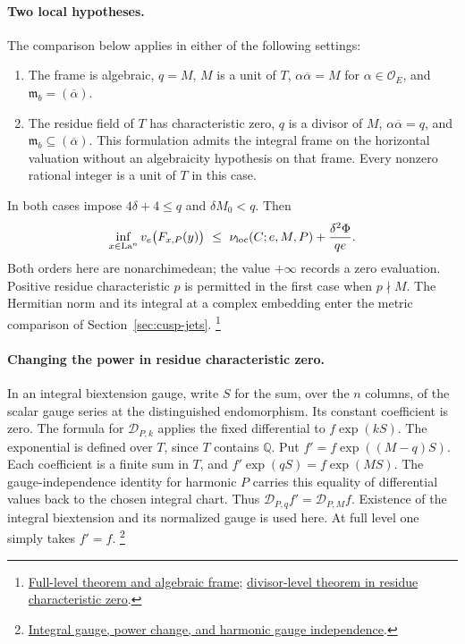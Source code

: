 \paragraph{Two local hypotheses.}
The comparison below applies in either of the following settings:
\begin{enumerate}
\item The frame is algebraic, \(q=M\), \(M\) is a unit of \(T\),
\(\alpha\overline\alpha=M\) for \(\alpha\in\mathcal O_E\), and
\(\mathfrak m_b=(\overline\alpha)\).
\item The residue field of \(T\) has characteristic zero,
\(q\) is a divisor of \(M\), \(\alpha\overline\alpha=q\), and
\(\mathfrak m_b\subseteq(\overline\alpha)\). This formulation admits
the integral frame on the horizontal valuation without an algebraicity
hypothesis on that frame. Every nonzero rational integer is a unit of
\(T\) in this case.
\end{enumerate}
In both cases impose \(4\delta+4\le q\) and \(\delta M_0<q\). Then
\begin{equation}\label{eq:local-theta-comp}
 \inf_{x\in\mathrm{La}^n}v_e\bigl(F_{x,P}(y)\bigr)
 \ \le\ \nu_{\rm loc}(C;e,M,P)+\frac{\delta^2\Phi}{qe}.
\end{equation}
Both orders here are nonarchimedean; the value \(+\infty\) records a
zero evaluation. Positive residue characteristic \(p\) is permitted in
the first case when \(p\nmid M\). The Hermitian norm and its integral at
a complex embedding enter the metric comparison of
Section~\ref{sec:cusp-jets}.
\footnote{\href{https://github.com/ChristianKudeba/alpoge-rh-verification/blob/alpoge-source-7cbf7a0c/src/Development/AbelianVarietyTheory/Proofs/DivisorProofs/IInfThRuleLeNuLocOf.lean}{Full-level theorem and algebraic frame};
\href{https://github.com/ChristianKudeba/alpoge-rh-verification/blob/alpoge-source-7cbf7a0c/src/Development/AbelianVarietyTheory/Proofs/DivisorProofs/IInfThetaRuleLeLocalValueCharZero.lean}{divisor-level theorem in residue characteristic zero}.}

\paragraph{Changing the power in residue characteristic zero.}
In an integral biextension gauge, write \(S\) for the sum, over the
\(n\) columns, of the scalar gauge series at the distinguished
endomorphism. Its constant coefficient is zero. The formula for
\(\mathcal D_{P,k}\) applies the fixed differential to
\(f\exp(kS)\). The exponential is defined over \(T\), since \(T\)
contains \(\mathbb Q\). Put \(f'=f\exp((M-q)S)\). Each coefficient
is a finite sum in \(T\), and \(f'\exp(qS)=f\exp(MS)\).
The gauge-independence identity for harmonic \(P\) carries this equality
of differential values back to the chosen integral chart. Thus
\(\mathcal D_{P,q}f'=\mathcal D_{P,M}f\). Existence of the integral
biextension and its normalized gauge is used here. At full level
one simply takes \(f'=f\).
\footnote{\href{https://github.com/ChristianKudeba/alpoge-rh-verification/blob/alpoge-source-7cbf7a0c/src/Development/AbelianVarietyTheory/Proofs/DivisorProofs/HarmonicValueIntegralGermFramePowerCharZero.lean}{Integral gauge, power change, and harmonic gauge independence}.}

